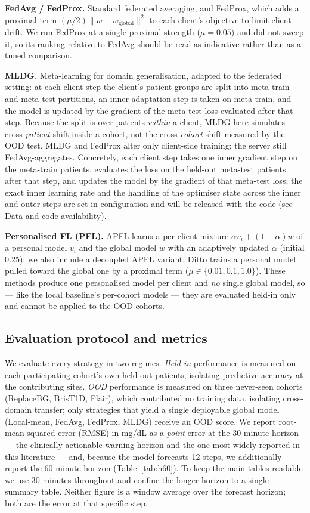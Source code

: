 \documentclass[10pt,letterpaper]{article}
\begin{document}
\textbf{FedAvg / FedProx.} Standard federated averaging, and FedProx, which adds
a proximal term $(\mu/2)\lVert w - w_{\text{global}}\rVert^2$ to each client's
objective to limit client drift. We run FedProx at a single proximal strength
($\mu=0.05$) and did not sweep it, so its ranking relative to FedAvg should be
read as indicative rather than as a tuned comparison.

\textbf{MLDG.} Meta-learning for domain generalisation, adapted to the federated
setting: at each client step the client's patient groups are split into
meta-train and meta-test partitions, an inner adaptation step is taken on
meta-train, and the model is updated by the gradient of the meta-test loss
evaluated after that step. Because the split is over patients \emph{within} a
client, MLDG here simulates cross-\emph{patient} shift inside a cohort, not the
cross-\emph{cohort} shift measured by the OOD test. MLDG and FedProx alter only
client-side training; the server still FedAvg-aggregates. Concretely, each client
step takes one inner gradient step on the meta-train patients, evaluates the loss
on the held-out meta-test patients after that step, and updates the model by the
gradient of that meta-test loss; the exact inner learning rate and the handling
of the optimiser state across the inner and outer steps are set in configuration
and will be released with the code (see Data and code availability).

\textbf{Personalised FL (PFL).} APFL learns a per-client mixture
$\alpha v_i + (1-\alpha)w$ of a personal model $v_i$ and the global model $w$
with an adaptively updated $\alpha$ (initial $0.25$); we also include a decoupled
APFL variant. Ditto trains a personal model pulled toward the global one by a
proximal term ($\mu\in\{0.01,0.1,1.0\}$). These methods produce one personalised
model per client and \emph{no} single global model, so --- like the local
baseline's per-cohort models --- they are evaluated held-in only and cannot be
applied to the OOD cohorts.

\subsection*{Evaluation protocol and metrics}

We evaluate every strategy in two regimes. \emph{Held-in} performance is measured
on each participating cohort's own held-out patients, isolating predictive
accuracy at the contributing sites. \emph{OOD} performance is measured on three
never-seen cohorts (ReplaceBG, BrisT1D, Flair), which contributed no training
data, isolating cross-domain transfer; only strategies that yield a single
deployable global model (Local-mean, FedAvg, FedProx, MLDG) receive an OOD score.
We report root-mean-squared error (RMSE) in mg/dL as a \emph{point} error at the
30-minute horizon --- the clinically actionable warning horizon and the one most
widely reported in this literature --- and, because the model forecasts 12 steps,
we additionally report the 60-minute horizon (Table~\ref{tab:h60}). To keep the
main tables readable we use 30 minutes throughout and confine the longer horizon
to a single summary table. Neither figure is a window average over the forecast
horizon; both are the error at that specific step.
\end{document}
